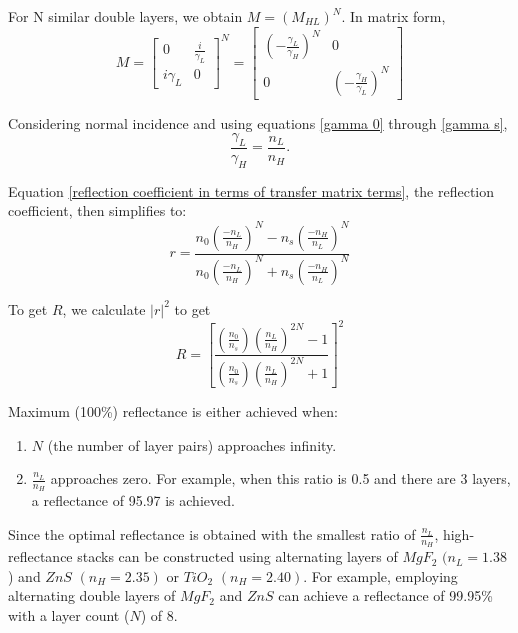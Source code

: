 For N similar double layers, we obtain $M = (M_{HL})^N$. In matrix form,
    \[
      M = 
            \begin{bmatrix}
            0 & \frac{i}{\gamma_L} \\
            i\gamma_L & 0
            \end{bmatrix}^N =
                \begin{bmatrix}
                    \left(-\frac{\gamma_L}{\gamma_H}\right)^N & 0  \\
                    0 & \left(-\frac{\gamma_H}{\gamma_L}\right)^N
                \end{bmatrix}
    \]

Considering normal incidence and using equations \ref{gamma 0} through \ref{gamma s},
\begin{equation}
    \frac{\gamma_L}{\gamma_H} = \frac{n_L}{n_H}.
\end{equation}

Equation \ref{reflection coefficient in terms of transfer matrix terms}, the reflection coefficient, then simplifies to:
    \begin{equation}\label{reflection coefficient for double high-reflectance layers}
    r = \frac{n_0\left(\frac{-n_L}{n_H}\right)^N - n_s\left(\frac{-n_H}{n_L}\right)^N}{n_0\left(\frac{-n_L}{n_H}\right)^N + n_s\left(\frac{-n_H}{n_L}\right)^N}
    \end{equation}

To get $R$, we calculate $|r|^2$ to get
    \begin{equation}\label{maximum reflectance equation}
    R = \left[ \frac{ \left( \frac{n_0}{n_s} \right) \left( \frac{n_L}{n_H} \right)^{2N}  - 1 }{  \left( \frac{n_0}{n_s} \right) \left( \frac{n_L}{n_H} \right)^{2N}  + 1     }  \right]^2
    \end{equation}

Maximum (100\%) reflectance is either achieved when:
    \begin{enumerate}
      \item $N$ (the number of layer pairs) approaches infinity.
      \item $\frac{n_L}{n_H}$ approaches zero. For example, when this ratio is 0.5 and there are 3 layers, a reflectance of 95.97 is achieved.
    \end{enumerate}
Since the optimal reflectance is obtained with the smallest ratio of $\frac{n_L}{n_H}$, high-reflectance stacks can be constructed using alternating layers of $MgF_2$ $(n_L = 1.38$) and $ZnS$ $(n_H = 2.35)$ or $TiO_2$ $(n_H = 2.40)$. For example, employing alternating double layers of $MgF_2$ and $ZnS$ can achieve a reflectance of 99.95\% with a layer count ($N$) of 8.


